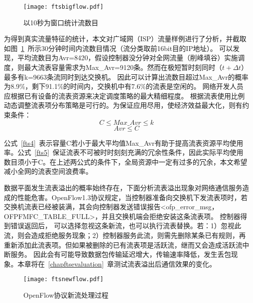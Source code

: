 \begin{figure}[!ht]
	\vspace{-1.5mm}
	\centering 
	\texttt{[image: ftsbigflow.pdf]}
	\caption{以10秒为窗口统计流数目} \label{fig:ftsbigflow}
\end{figure}

为得到真实流量特征的统计，本文对广域网（ISP）流量样例进行了分析，并截取如图~\ref{fig:ftsbigflow}~所示30分钟时间内流数目情况（流分类取前16bit目的IP地址）。
可以发现，平均流数目为Avr=8420，假设控制器没分钟对全网流量（削峰填谷）实施调度，则最大流表容量需求为Max\_Avr=9120条。然而在极短暂时刻同时（$t+\Delta t$）最多有k=9663条流同时到达交换机。
因此可以计算出流数目超过Max\_Avr的概率为8.9\%，剩下91.1\%的时间内，交换机中有7.6\%的流表是空闲的。
网络开发人员应根据已有设备的流表资源来决定调度策略的最大精细程度。
根据流表使用比例动态调整流表项分布策略是可行的。为保证应用尽用，使经济效益最大化，则有约束条件：
\begin{equation}\label{fts4}
C \leq Max\_Avr \leq k 
\end{equation}
\begin{equation}\label{fts5}
Avr \leq C 
\end{equation}

公式~\ref{fts4}~表示容量C若小于最大平均值Max\_Avr有助于提高流表资源平均使用率。公式~\ref{fts5}~保证流表不可被时时刻刻充满的冗余性条件，因此实际平均使用数目须小于C。在上述两公式的条件下，全局资源中一定有过多的冗余，本文希望减小全网的流表空间浪费率。

数据平面发生流表溢出的概率始终存在，下面分析流表溢出现象对网络通信服务造成的性能危害。OpenFlow1.3协议规定，当控制器准备向交换机下发流表项时，若交换机流表已经被装满，其会向控制器发送错误报告<ofp\_error\_msg，OFPFMFC\_TABLE\_FULL>，并且交换机端会拒绝安装这条流表项。
控制器得到错误返回后， 可以选择忽视这条新流，也可以执行流表替换。若：1）忽视此流，则会造成拒绝服务现象；2）控制器服务此流，则需先删除某条已有规则，再重新添加此流表项。但如果被删除的已有流表项是活跃流，继而又会造成活跃流中断服务。
因此会有可能导致数据包传输延迟增大，传输速率降低，发生丢包现象。本章将在~\ref{chapftsevaluation}~章测试流表溢出后通信效果的变化。



\begin{figure}[!ht]
	\centering 
	\vspace{-1.5mm} 
	\texttt{[image: ftsnewflow.pdf]}
	\caption{OpenFlow协议新流处理过程} \label{fig:ftsnewflow}
\end{figure}

